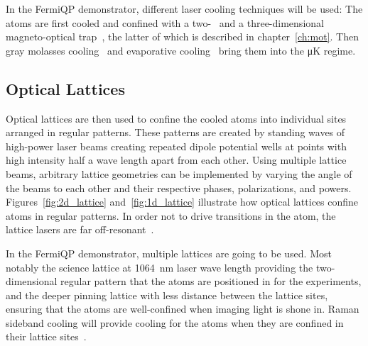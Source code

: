 In the FermiQP demonstrator, different laser cooling techniques will be used: The atoms are first cooled and confined with a two-~\cite{qesja_design_2022} and a three-dimensional magneto-optical trap~\cite{foot_atomic_2005}, the latter of which is described in chapter~\ref{ch:mot}. Then gray molasses cooling~\cite{weidemuller_novel_1994} and evaporative cooling~\cite{foot_atomic_2005, sun_construction_2022} bring them into the \si[]{\micro\kelvin} regime.

\subsection*{Optical Lattices}\label{ch:optical_lattices}
Optical lattices are then used to confine the cooled atoms into individual sites arranged in regular patterns. These patterns are created by standing waves of high-power laser beams creating repeated dipole potential wells at points with high intensity half a wave length apart from each other. Using multiple lattice beams, arbitrary lattice geometries can be implemented by varying the angle of the beams to each other and their respective phases, polarizations, and powers. Figures~\ref{fig:2d_lattice} and~\ref{fig:1d_lattice} illustrate how optical lattices confine atoms in regular patterns. In order not to drive transitions in the atom, the lattice lasers are far off-resonant~\cite{bloch_many-body_2008, bloch_quantum_2012}.

In the FermiQP demonstrator, multiple lattices are going to be used. Most notably the science lattice at \SI[]{1064}{\nano\meter} laser wave length providing the two-dimensional regular pattern that the atoms are positioned in for the experiments, and the deeper pinning lattice with less distance between the lattice sites, ensuring that the atoms are well-confined when imaging light is shone in. Raman sideband cooling will provide cooling for the atoms when they are confined in their lattice sites~\cite{hilker_spin-resolved_2017, krumm_notitle_2022}.

